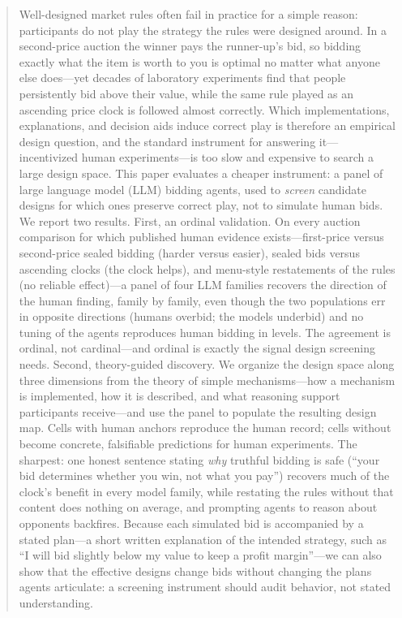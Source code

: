 \begin{abstract}
Well-designed market rules often fail in practice for a simple reason: participants do not play the strategy the rules were designed around. In a second-price auction the winner pays the runner-up's bid, so bidding exactly what the item is worth to you is optimal no matter what anyone else does---yet decades of laboratory experiments find that people persistently bid above their value, while the same rule played as an ascending price clock is followed almost correctly. Which implementations, explanations, and decision aids induce correct play is therefore an empirical design question, and the standard instrument for answering it---incentivized human experiments---is too slow and expensive to search a large design space. This paper evaluates a cheaper instrument: a panel of large language model (LLM) bidding agents, used to \emph{screen} candidate designs for which ones preserve correct play, not to simulate human bids. We report two results. First, an ordinal validation. On every auction comparison for which published human evidence exists---first-price versus second-price sealed bidding (harder versus easier), sealed bids versus ascending clocks (the clock helps), and menu-style restatements of the rules (no reliable effect)---a panel of four LLM families recovers the direction of the human finding, family by family, even though the two populations err in opposite directions (humans overbid; the models underbid) and no tuning of the agents reproduces human bidding in levels. The agreement is ordinal, not cardinal---and ordinal is exactly the signal design screening needs. Second, theory-guided discovery. We organize the design space along three dimensions from the theory of simple mechanisms---how a mechanism is implemented, how it is described, and what reasoning support participants receive---and use the panel to populate the resulting design map. Cells with human anchors reproduce the human record; cells without become concrete, falsifiable predictions for human experiments. The sharpest: one honest sentence stating \emph{why} truthful bidding is safe (``your bid determines whether you win, not what you pay'') recovers much of the clock's benefit in every model family, while restating the rules without that content does nothing on average, and prompting agents to reason about opponents backfires. Because each simulated bid is accompanied by a stated plan---a short written explanation of the intended strategy, such as ``I will bid slightly below my value to keep a profit margin''---we can also show that the effective designs change bids without changing the plans agents articulate: a screening instrument should audit behavior, not stated understanding.
\end{abstract}
